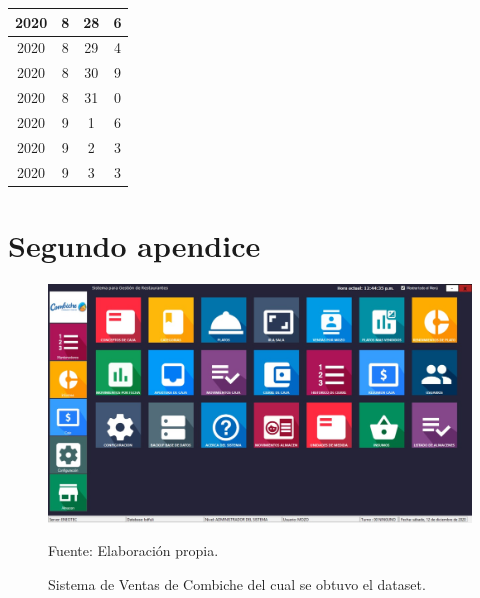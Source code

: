 \begin{longtable} {|c|c|c|c|}
\hline
2020         & 8            & 28           & 6                         \\ 
\hline
2020         & 8            & 29           & 4                         \\ 
\hline
2020         & 8            & 30           & 9                         \\ 
\hline
2020         & 8            & 31           & 0                         \\ 
\hline
2020         & 9            & 1            & 6                         \\ 
\hline
2020         & 9            & 2            & 3                         \\ 
\hline
2020         & 9            & 3            & 3                         \\
\hline
\end{longtable}




\chapter{Segundo apendice}
%
%
\vskip 0.5cm
\begin{figure}[h!]
	\centering
		\includegraphics[scale=0.3]{imagenes/combichesistema.jpeg}
		\caption{Sistema de Ventas de Combiche del cual se obtuvo el dataset.}
	\begin{center}
    Fuente: Elaboración propia.
    \end{center}
	\label{fig:DescriPatron}
\end{figure}


